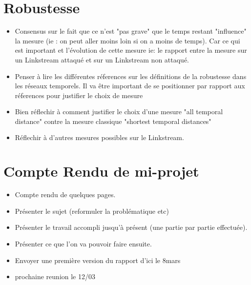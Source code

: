 \documentclass{article}
\begin{document}
\section*{Robustesse}
	\begin{itemize}
		\item Consensus sur le fait que ce n'est "pas grave" que le temps restant "influence" la mesure (ie : on peut aller moins loin si on a moins de temps). Car ce qui est important et l'évolution de cette mesure ie: le rapport entre la mesure sur un Linkstream attaqué et sur un Linkstream non attaqué. 
		\item Penser à lire les différentes réferences sur les définitions de la robustesse dans les réseaux temporels. Il va être important de se positionner par rapport aux réferences pour justifier le choix de mesure
		\item Bien réflechir à comment justifier le choix d'une mesure "all temporal distance" contre la mesure classique "shortest temporal distances" 
		\item Réflechir à d'autres mesures possibles sur le Linkstream.  
		\end{itemize}
	
\newpage
	
			\section*{Compte Rendu de mi-projet}
	\begin{itemize}
		\item Compte rendu de quelques pages. 
		\item Présenter le sujet (reformuler la problématique etc) 
		\item Présenter le travail accompli jusqu'à présent (une partie par partie effectuée). 
		\item Présenter ce que l'on va pouvoir faire ensuite. 
		\item Envoyer une première version du rapport d'ici le 8mars 

	\end{itemize}
		
\begin{itemize}
\item prochaine reunion le 12/03
\end{itemize}
\end{document}

